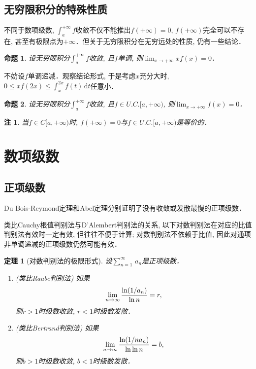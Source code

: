\documentclass[11pt,a4paper]{ctexart}
\makeatletter
\theoremstyle{thmseries} %
\newtheorem{thm}{定理}[section]
\newtheorem{prop}{命题}[section]
\theoremstyle{exerseries}
\newtheorem*{rem}{注}
\renewenvironment{proof}[1][\proofname]{\par
  \pushQED{\qed}%
  \normalfont \topsep6\p@\@plus6\p@\relax
  \trivlist
  \item[\hskip\labelsep
        \itshape
    #1\@addpunct{}]\ignorespaces
}{%
  \popQED\endtrivlist\@endpefalse
}
\newenvironment{pf}{\begin{proof}[\bfseries\upshape 证\quad]}{\end{proof}}
\newcommand{\bra}[1]{\mathopen{}\left(#1\right)}
\renewcommand{\d}{\mathrm{d}}
\def \nti {\mathnormal{n}\to\infty}
\def \tseries {{\textstyle\sum\limits_{n=1}^{\infty}}\,} %
\makeatother
\begin{document}
\subsection{无穷限积分的特殊性质}
不同于数项级数, $\int_{a}^{+\infty}f$收敛不仅不能推出$f(+\infty)=0$, $f(+\infty)$完全可以不存在, 甚至有极限点为$+\infty$．但关于无穷限积分在无穷远处的性质, 仍有一些结论．
\begin{prop}
	设无穷限积分$\int_{a}^{+\infty}f$收敛, 且$f$单调, 则$\lim_{x\to+\infty}xf(x)=0$．
\end{prop}
\begin{pf}
	不妨设$f$单调递减．观察结论形式, 于是考虑$x$充分大时, $0\leq xf(2x)\leq\int_{x}^{2x}f(t)\,\d t$任意小．
\end{pf}
\begin{prop}
	设无穷限积分$\int_{a}^{+\infty}f$收敛, 且$f\in U.C.[a,+\infty)$, 则$\lim_{x\to+\infty}f(x)=0$．
\end{prop}
\begin{rem}
	当$f\in C[a,+\infty)$时, $f(+\infty)=0$与$f\in U.C.[a,+\infty)$是等价的．
\end{rem}


\section{数项级数}
\subsection{正项级数}
Du Bois-Reymond定理和Abel定理分别证明了没有收敛或发散最慢的正项级数．

类比Cauchy根值判别法与D'Alembert判别法的关系, 以下对数判别法在对应的比值判别法有效时一定有效, 但往往不便于计算; 对数判别法不依赖于比值, 因此对通项非单调递减的正项级数仍然可能有效．
\begin{thm}[对数判别法的极限形式]
	设$\tseries a_n$是正项级数．
	\begin{enumerate}
		\item (类比Raabe判别法) 如果
		\[\lim_{\nti}\frac{\ln\bra{1/a_n}}{\ln n}=r,\]
		则$r>1$时级数收敛, $r<1$时级数发散．
		\item (类比Bertrand判别法) 如果
		\[\lim_{\nti}\frac{\ln\bra{1/na_n}}{\ln\ln n}=b,\]
		则$b>1$时级数收敛, $b<1$时级数发散．
	\end{enumerate}
\end{thm}
\end{document}
